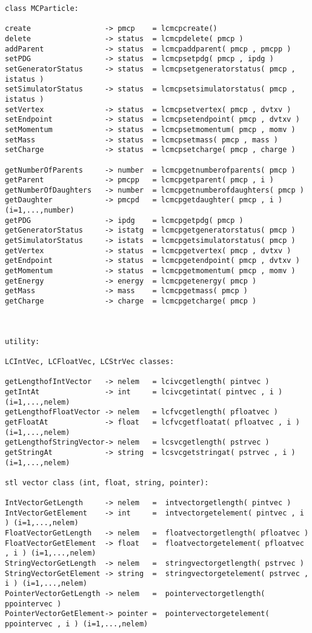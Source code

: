 \begin{scriptsize}
\begin{verbatim}
class MCParticle:

create                 -> pmcp    = lcmcpcreate()
delete                 -> status  = lcmcpdelete( pmcp )
addParent              -> status  = lcmcpaddparent( pmcp , pmcpp )
setPDG                 -> status  = lcmcpsetpdg( pmcp , ipdg )
setGeneratorStatus     -> status  = lcmcpsetgeneratorstatus( pmcp , istatus )
setSimulatorStatus     -> status  = lcmcpsetsimulatorstatus( pmcp , istatus )
setVertex              -> status  = lcmcpsetvertex( pmcp , dvtxv )
setEndpoint            -> status  = lcmcpsetendpoint( pmcp , dvtxv )
setMomentum            -> status  = lcmcpsetmomentum( pmcp , momv )
setMass                -> status  = lcmcpsetmass( pmcp , mass )
setCharge              -> status  = lcmcpsetcharge( pmcp , charge )

getNumberOfParents     -> number  = lcmcpgetnumberofparents( pmcp )
getParent              -> pmcpp   = lcmcpgetparent( pmcp , i )
getNumberOfDaughters   -> number  = lcmcpgetnumberofdaughters( pmcp )
getDaughter            -> pmcpd   = lcmcpgetdaughter( pmcp , i )  (i=1,...,number)
getPDG                 -> ipdg    = lcmcpgetpdg( pmcp )
getGeneratorStatus     -> istatg  = lcmcpgetgeneratorstatus( pmcp )
getSimulatorStatus     -> istats  = lcmcpgetsimulatorstatus( pmcp )
getVertex              -> status  = lcmcpgetvertex( pmcp , dvtxv )
getEndpoint            -> status  = lcmcpgetendpoint( pmcp , dvtxv )
getMomentum            -> status  = lcmcpgetmomentum( pmcp , momv )
getEnergy              -> energy  = lcmcpgetenergy( pmcp )
getMass                -> mass    = lcmcpgetmass( pmcp )
getCharge              -> charge  = lcmcpgetcharge( pmcp )



utility: 

LCIntVec, LCFloatVec, LCStrVec classes:

getLengthofIntVector   -> nelem   = lcivcgetlength( pintvec )
getIntAt               -> int     = lcivcgetintat( pintvec , i ) (i=1,...,nelem)
getLengthofFloatVector -> nelem   = lcfvcgetlength( pfloatvec )
getFloatAt             -> float   = lcfvcgetfloatat( pfloatvec , i ) (i=1,...,nelem)
getLengthofStringVector-> nelem   = lcsvcgetlength( pstrvec )
getStringAt            -> string  = lcsvcgetstringat( pstrvec , i ) (i=1,...,nelem)

stl vector class (int, float, string, pointer):

IntVectorGetLength     -> nelem   =  intvectorgetlength( pintvec )
IntVectorGetElement    -> int     =  intvectorgetelement( pintvec , i ) (i=1,...,nelem)
FloatVectorGetLength   -> nelem   =  floatvectorgetlength( pfloatvec )
FloatVectorGetElement  -> float   =  floatvectorgetelement( pfloatvec , i ) (i=1,...,nelem)
StringVectorGetLength  -> nelem   =  stringvectorgetlength( pstrvec )
StringVectorGetElement -> string  =  stringvectorgetelement( pstrvec , i ) (i=1,...,nelem)
PointerVectorGetLength -> nelem   =  pointervectorgetlength( ppointervec )
PointerVectorGetElement-> pointer =  pointervectorgetelement( ppointervec , i ) (i=1,...,nelem)

\end{verbatim}

\end{scriptsize}
